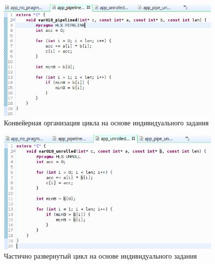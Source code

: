 \begin{figure}[H]
	\begin{center}
		\includegraphics[scale=0.6]{img/pipelined.png}
	\end{center}
	\captionsetup{justification=centering}
	\caption{Конвейерная организация цикла на основе
индивидуального задания}
	\label{img:pipelined}
\end{figure}

\begin{figure}[H]
	\begin{center}
		\includegraphics[scale=0.6]{img/unrolled.png}
	\end{center}
	\captionsetup{justification=centering}
	\caption{Частично развернутый цикл на основе индивидуального задания}
	\label{img:unrolled}
\end{figure}

